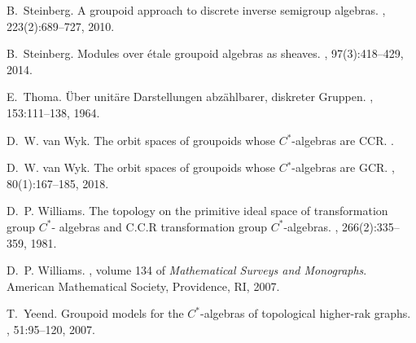 \documentclass[11pt,reqno]{amsart}
\theoremstyle{plain}
\numberwithin{equation}{section}
\begin{document}
\begin{thebibliography}{10}
B.~Steinberg.
\newblock A groupoid approach to discrete inverse semigroup algebras.
, 223(2):689--727, 2010.

B.~Steinberg.
\newblock Modules over \'{e}tale groupoid algebras as sheaves.
, 97(3):418--429, 2014.

E.~Thoma.
\newblock \"{U}ber unit\"{a}re {D}arstellungen abz\"{a}hlbarer, diskreter
  {G}ruppen.
, 153:111--138, 1964.

D.~W. van Wyk.
\newblock The orbit spaces of groupoids whose {$C{^\ast}$}-algebras are {CCR}.
.

D.~W. van Wyk.
\newblock The orbit spaces of groupoids whose {$C{^\ast}$}-algebras are {GCR}.
, 80(1):167--185, 2018.

D.~P. Williams.
\newblock The topology on the primitive ideal space of transformation group
  {$C^\ast$}- algebras and {C.C.R} transformation group {$C^\ast$}-algebras.
, 266(2):335--359, 1981.

D.~P. Williams.
, volume 134 of {\em
  Mathematical Surveys and Monographs}.
\newblock American Mathematical Society, Providence, RI, 2007.

T.~Yeend.
\newblock Groupoid models for the {$C^{\ast}$}-algebras of topological
  higher-rak graphs.
, 51:95--120, 2007.

\end{thebibliography}

%
%
%
%
%	
%
%
%	
\end{document}
